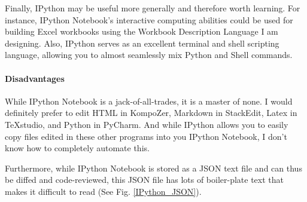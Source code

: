 \documentclass[]{article}
\begin{document}
		Finally, IPython may be useful more generally and therefore worth learning.  
		For instance, IPython Notebook's interactive computing abilities could be used for building Excel workbooks 
			using the Workbook Description Language I am designing.
		Also, IPython serves as an excellent terminal and shell scripting language, allowing you to almost seamlessly mix Python and Shell commands.
		
	\paragraph{Disadvantages}	
		While IPython Notebook is a jack-of-all-trades, it is a master of none.  
		I would definitely prefer to edit HTML in KompoZer, Markdown in StackEdit, Latex in TeXstudio, and Python in PyCharm.  
		And while IPython allows you to easily copy files edited in these other programs into you IPython Notebook, I don't know how to completely automate this.
		
		Furthermore, while IPython Notebook is stored as a JSON text file and can thus be diffed and code-reviewed, 
		this JSON file has lots of boiler-plate text that makes it difficult to read (See Fig. \ref{IPython_JSON}).
		
\end{document}
